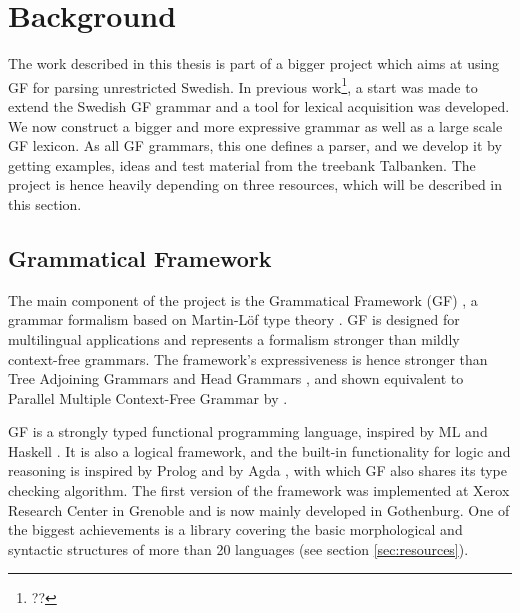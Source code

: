 \documentclass{report}
\begin{document}

\chapter{Background}  
\label{sec:background}
The work described in this thesis is part of a bigger project which aims at
using GF for parsing unrestricted Swedish. 
In previous work\footnote{??}, a start was made to extend the Swedish GF grammar
and a tool for lexical acquisition was developed.
We now construct a bigger
and more expressive grammar as well as a large scale GF lexicon.
As all GF grammars, this one defines a parser, and we develop it by getting
examples, ideas and test material from the treebank Talbanken.
The project is hence heavily depending on three resources, which will be described
in this section.

\section{Grammatical Framework}
\label{sec:gf}
The main component of the project is the Grammatical Framework (GF) \cite{gfbok}, %
a grammar formalism based on Martin-Löf type theory \cite{martinlof}. GF is
designed for multilingual applications and represents a formalism
stronger than mildly context-free grammars. 
The framework's %
expressiveness is hence stronger than 
Tree Adjoining Grammars \cite{tag} and Head Grammars \cite{hg}, and shown
equivalent to Parallel Multiple Context-Free Grammar \cite{pmcfg} by \cite{peter}.

GF is a strongly typed functional programming language, inspired by
ML \cite{ml} and Haskell \cite{haskell}. It is also a logical framework,
and the built-in functionality for logic and reasoning 
is inspired by \textlambda Prolog \cite{prolog} and 
by Agda \cite{agda}, with which GF also shares its type checking algorithm.
The first version of the framework was implemented at Xerox Research Center
in Grenoble and is now mainly developed in Gothenburg. One of the biggest
achievements is a library covering the 
basic morphological and syntactic structures of more than
20 languages (see section \ref{sec:resources}).
\end{document}
